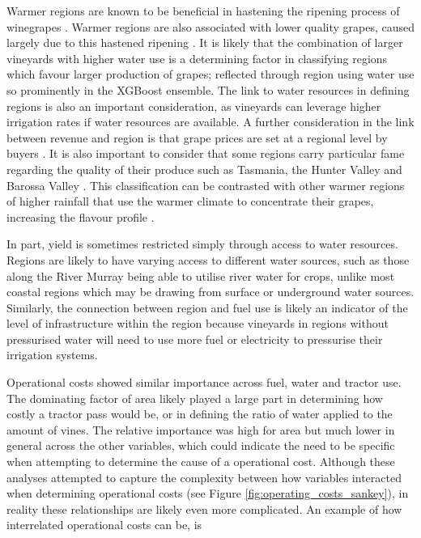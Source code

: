 \documentclass[review,12pt,authoryear]{elsarticle}
\begin{document}
\begin{linenumbers}
Warmer regions are known to be beneficial in hastening the ripening process of winegrapes \citep{webbObservedTrendsWinegrape2011}. Warmer regions are also associated with lower quality grapes, caused largely due to this hastened ripening \citep{botting1996canopy}. It is likely that the combination of larger vineyards with higher water use is a determining factor in classifying regions which favour larger production of grapes; reflected through region using water use so prominently in the XGBoost ensemble. The link to water resources in defining regions is also an important consideration, as vineyards can leverage higher irrigation rates if water resources are available. A further consideration in the link between revenue and region is that grape prices are set at a regional level by buyers \citep{wineaustraliaNationalVintageReport2022}. It is also important to consider that some regions carry particular fame regarding the quality of their produce such as Tasmania, the Hunter Valley and Barossa Valley \citep{hallidayAustralianWineEncyclopedia2009}. This classification can be contrasted with other warmer regions of higher rainfall that use the warmer climate to concentrate their grapes, increasing the flavour profile \citep{goodwinijeriepRegulatedDeficitIrrigation1992,mgmccarthyEffectCropLoad1986}.
\par
In part, yield is sometimes restricted simply through access to water resources. Regions are likely to have varying access to different water sources, such as those along the River Murray being able to utilise river water for crops, unlike most coastal regions which may be drawing from surface or underground water sources. Similarly, the connection between region and fuel use is likely an indicator of the level of infrastructure within the region because vineyards in regions without pressurised water will need to use more fuel or electricity to pressurise their irrigation systems.
\par
Operational costs showed similar importance across fuel, water and tractor use. The dominating factor of area likely played a large part in determining how costly a tractor pass would be, or in defining the ratio of water applied to the amount of vines. The relative importance was high for area but much lower in general across the other variables, which could indicate the need to be specific when attempting to determine the cause of a operational cost. Although these analyses attempted to capture the complexity between how variables interacted when determining operational costs (see Figure \ref{fig:operating_costs_sankey}), in reality these relationships are likely even more complicated. An example of how interrelated operational costs can be, is 

\end{linenumbers}
\end{document}

